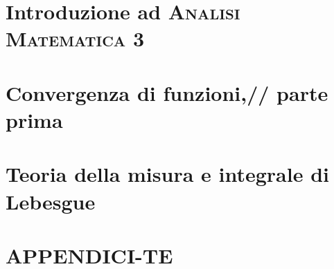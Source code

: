 \documentclass[a4paper, 11pt, twoside, openright, italian]{memoir}
\begin{document}
\frontmatter




\mainmatter

\part{Introduzione ad \textsc{Analisi Matematica 3}}

\part{Convergenza di funzioni,// parte prima}



\part{Teoria della misura e integrale di Lebesgue}


%
%
%
%
%
%
\part{APPENDICI-TE}

%

%
\backmatter

\end{document}
